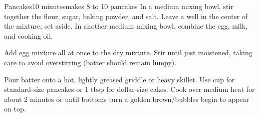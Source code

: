 \begin{recipe}{Pancakes}{10 minutes}{makes 8 to 10 pancakes}
In a medium mixing bowl, stir together the flour, sugar, baking powder, and
salt. Leave a well in the center of the mixture; set aside.
In another medium mixing bowl, combine the egg, milk, and cooking oil.\newstep

Add egg mixture all at once to the dry mixture. Stir until just moistened,
taking care to avoid overstirring (batter should remain lumpy).\newstep

Pour batter onto a hot, lightly greased griddle or heavy skillet. Use  cup
for standard-size pancakes or 1 tbsp for dollar-size cakes. Cook over medium
heat for about 2 minutes or until bottoms turn a golden brown/bubbles begin to
appear on top.

\end{recipe}
